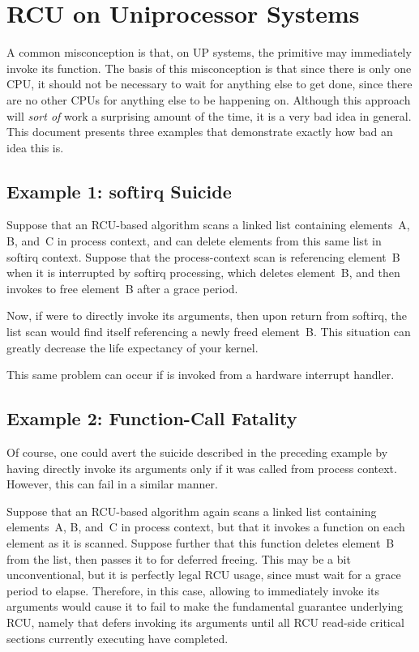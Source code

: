\section{RCU on Uniprocessor Systems}
\label{sec:rcu:RCU on Uniprocessor Systems}

A common misconception is that, on UP systems, the  primitive
may immediately invoke its function.
The basis of this misconception
is that since there is only one CPU, it should not be necessary to
wait for anything else to get done, since there are no other CPUs for
anything else to be happening on.
Although this approach will \emph{sort of}
work a surprising amount of the time, it is a very bad idea in general.
This document presents three examples that demonstrate exactly how bad
an idea this is.

\subsection{Example 1: softirq Suicide}

Suppose that an RCU-based algorithm scans a linked list containing
elements~A, B, and~C in process context, and can delete elements from
this same list in softirq context.
Suppose that the process-context scan
is referencing element~B when it is interrupted by softirq processing,
which deletes element~B, and then invokes  to free element~B
after a grace period.

Now, if  were to directly invoke its arguments, then upon return
from softirq, the list scan would find itself referencing a newly freed
element~B.
This situation can greatly decrease the life expectancy of
your kernel.

This same problem can occur if  is invoked from a hardware
interrupt handler.

\subsection{Example 2: Function-Call Fatality}

Of course, one could avert the suicide described in the preceding example
by having  directly invoke its arguments only if it was called
from process context.
However, this can fail in a similar manner.

Suppose that an RCU-based algorithm again scans a linked list containing
elements~A, B, and~C in process context, but that it invokes a function
on each element as it is scanned.
Suppose further that this function
deletes element~B from the list, then passes it to  for deferred
freeing.
This may be a bit unconventional, but it is perfectly legal
RCU usage, since  must wait for a grace period to elapse.
Therefore, in this case, allowing  to immediately invoke
its arguments would cause it to fail to make the fundamental guarantee
underlying RCU, namely that  defers invoking its arguments until
all RCU read-side critical sections currently executing have completed.

